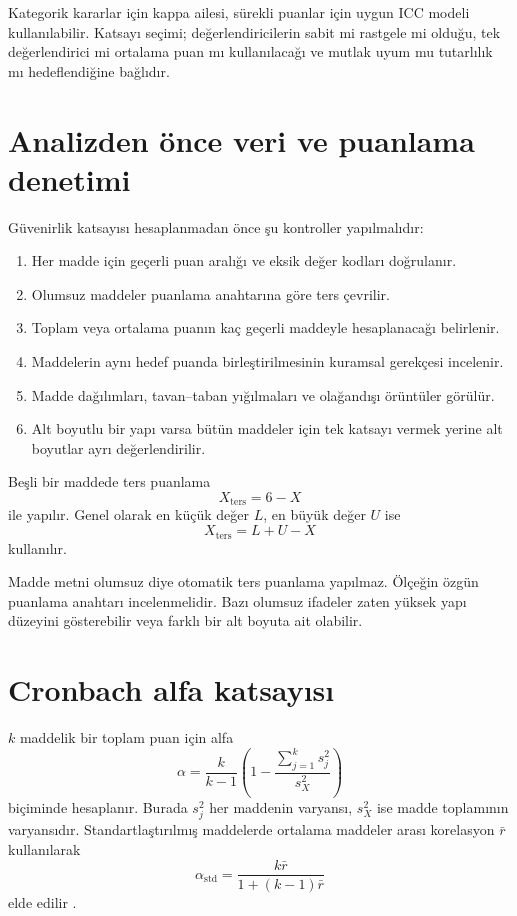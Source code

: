 Kategorik kararlar için kappa ailesi, sürekli puanlar için uygun ICC modeli
kullanılabilir. Katsayı seçimi; değerlendiricilerin sabit mi rastgele mi
olduğu, tek değerlendirici mi ortalama puan mı kullanılacağı ve mutlak uyum mu
tutarlılık mı hedeflendiğine bağlıdır.

\section{Analizden önce veri ve puanlama denetimi}

Güvenirlik katsayısı hesaplanmadan önce şu kontroller yapılmalıdır:

\begin{enumerate}
  \item Her madde için geçerli puan aralığı ve eksik değer kodları doğrulanır.
  \item Olumsuz maddeler puanlama anahtarına göre ters çevrilir.
  \item Toplam veya ortalama puanın kaç geçerli maddeyle hesaplanacağı belirlenir.
  \item Maddelerin aynı hedef puanda birleştirilmesinin kuramsal gerekçesi incelenir.
  \item Madde dağılımları, tavan--taban yığılmaları ve olağandışı örüntüler görülür.
  \item Alt boyutlu bir yapı varsa bütün maddeler için tek katsayı vermek yerine
  alt boyutlar ayrı değerlendirilir.
\end{enumerate}


Beşli bir maddede ters puanlama
\[
X_{\text{ters}}=6-X
\]
ile yapılır. Genel olarak en küçük değer $L$, en büyük değer $U$ ise
\[
X_{\text{ters}}=L+U-X
\]
kullanılır.

\begin{mistakebox}
Madde metni olumsuz diye otomatik ters puanlama yapılmaz. Ölçeğin özgün
puanlama anahtarı incelenmelidir. Bazı olumsuz ifadeler zaten yüksek yapı
düzeyini gösterebilir veya farklı bir alt boyuta ait olabilir.
\end{mistakebox}

\section{Cronbach alfa katsayısı}

$k$ maddelik bir toplam puan için alfa
\[
\alpha=\frac{k}{k-1}
\left(1-\frac{\sum_{j=1}^{k}s_j^2}{s_X^2}\right)
\]
biçiminde hesaplanır. Burada $s_j^2$ her maddenin varyansı, $s_X^2$ ise madde
toplamının varyansıdır. Standartlaştırılmış maddelerde ortalama maddeler arası
korelasyon $\bar r$ kullanılarak
\[
\alpha_{\text{std}}=\frac{k\bar r}{1+(k-1)\bar r}
\]
elde edilir \citep{cronbach1951}.

